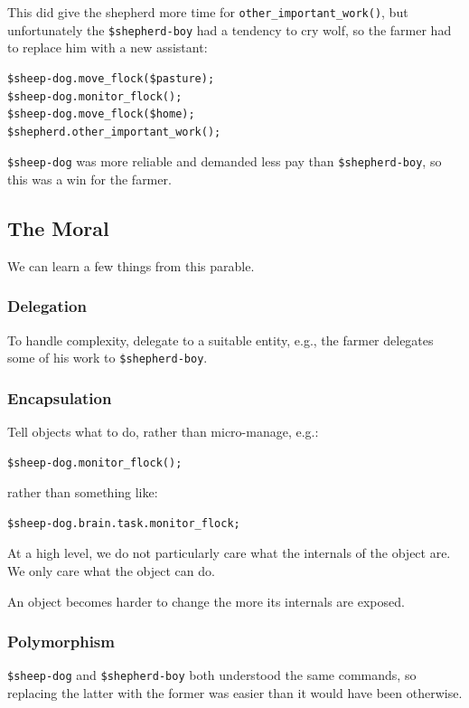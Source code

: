 This did give the shepherd more time for 
\verb'other_important_work()', but unfortunately the 
\verb'$shepherd-boy' had a tendency to cry wolf, so 
the farmer had to replace him with a new assistant:

\begin{verbatim}
$sheep-dog.move_flock($pasture);
$sheep-dog.monitor_flock();
$sheep-dog.move_flock($home);
$shepherd.other_important_work();
\end{verbatim}

\verb'$sheep-dog' was more reliable and demanded 
less pay than \verb'$shepherd-boy', so this was 
a win for the farmer.

\subsection{The Moral}

We can learn a few things from this parable.

\subsubsection{Delegation}

To handle complexity, delegate to a suitable 
entity, e.g., the farmer delegates some of his 
work to \verb'$shepherd-boy'.

\subsubsection{Encapsulation}

Tell objects what to do, rather than micro-manage, e.g.:

\begin{verbatim}
$sheep-dog.monitor_flock();
\end{verbatim}

rather than something like:

\begin{verbatim}
$sheep-dog.brain.task.monitor_flock;
\end{verbatim}

At a high level, we do not particularly care 
what the internals of the object are. We only 
care what the object can do.

An object becomes harder to change the 
more its internals are exposed.

\subsubsection{Polymorphism}
\verb'$sheep-dog' and \verb'$shepherd-boy' both 
understood the same commands, so replacing the 
latter with the former was easier than it would 
have been otherwise. 

